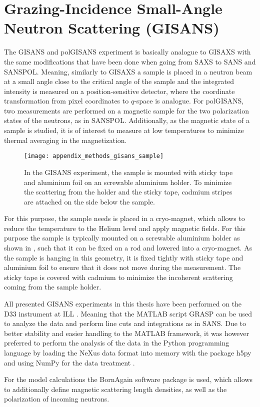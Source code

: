 \documentclass[\main/dresen_thesis.tex]{subfiles}
\begin{document}
  \section{Grazing-Incidence Small-Angle Neutron Scattering (GISANS)}
    \label{ch:methods:gisans}
    The GISANS and polGISANS experiment is basically analogue to GISAXS with the same modifications that have been done when going from SAXS to SANS and SANSPOL.
    Meaning, similarly to GISAXS a sample is placed in a neutron beam at a small angle close to the critical angle of the sample and the integrated intensity is measured on a position-sensitive detector, where the coordinate transformation from pixel coordinates to $q$-space is analogue.
    For polGISANS, two measurements are performed on a magnetic sample for the two polarization states of the neutrons, as in SANSPOL.
    Additionally, as the magnetic state of a sample is studied, it is of interest to measure at low temperatures to minimize thermal averaging in the magnetization.

    \begin{figure}[tb]
      \centering
      \texttt{[image: appendix\_methods\_gisans\_sample]}
      \caption{\label{fig:methods:gisans:samples}In the GISANS experiment, the sample is mounted with sticky tape and aluminium foil on an screwable aluminium holder. To minimize the scattering from the holder and the sticky tape, cadmium stripes are attached on the side below the sample.}
    \end{figure}

    For this purpose, the sample needs is placed in a cryo-magnet, which allows to reduce the temperature to the Helium level and apply magnetic fields.
    For this purpose the sample is typically mounted on a screwable aluminium holder as shown in , such that it can be fixed on a rod and lowered into a cryo-magnet.
    As the sample is hanging in this geometry, it is fixed tightly with sticky tape and aluminium foil to ensure that it does not move during the measurement.
    The sticky tape is covered with cadmium to minimize the incoherent scattering coming from the sample holder.

    All presented GISANS experiments in this thesis have been performed on the D33 instrument at ILL .
    Meaning that the MATLAB script GRASP can be used to analyze the data and perform line cuts and integrations as in SANS.
    Due to better stability and easier handling to the MATLAB framework, it was however preferred to perform the analysis of the data in the Python programming language by loading the NeXus data format into memory with the package h5py \cite{collette_2013_h5py} and using NumPy for the data treatment \cite{Oliphant_2006_Guide}.

    For the model calculations the BornAgain software package \cite{Burle_2018_borna} is used, which allows to additionally define magnetic scattering length densities, as well as the polarization of incoming neutrons.
\end{document}
